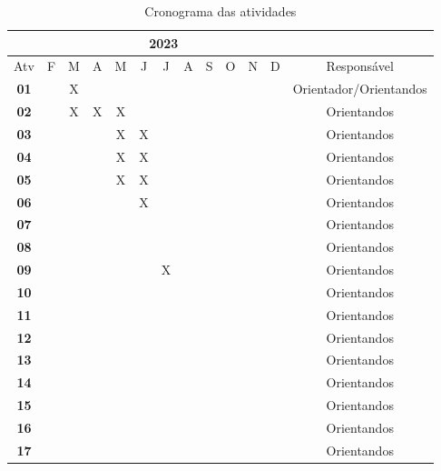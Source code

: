 \begin{table*}[ht]
\centering
\caption{Cronograma das atividades}
\label{tab:cronograma}
    \begin{tabular}{|c|c|c|c|c|c|c|c|c|c|c|c|c|}
        \hline & \multicolumn{11}{|c|}{2023} & \multicolumn{1}{|c|}{} \\
        \hline \multicolumn{1}{|c|}{Atv} & F & M & A & M & J & J & A & S & O & N & D & {Responsável} \\
        \hline \textbf{01} & & X& & & & & & & & & & Orientador/Orientandos \\
        \hline \textbf{02} & & X& X& X& & & & & & & & Orientandos \\
        \hline \textbf{03} & & & & X& X& & & & & & & Orientandos\\
        \hline \textbf{04} & & & & X& X& & & & & & & Orientandos\\
        \hline \textbf{05} & & & & X& X& & & & & & & Orientandos\\
        \hline \textbf{06} & & & & & X& & & & & & & Orientandos\\
        \hline \textbf{07} & & & & & & & & & & & & Orientandos\\
        \hline \textbf{08} & & & & & & & & & & & & Orientandos\\
        \hline \textbf{09} & & & & & & X& & & & & & Orientandos\\
        \hline \textbf{10} & & & & & & & & & & & & Orientandos\\
        \hline \textbf{11} & & & & & & & & & & & & Orientandos\\
        \hline \textbf{12} & & & & & & & & & & & & Orientandos\\
        \hline \textbf{13} & & & & & & & & & & & & Orientandos\\
        \hline \textbf{14} & & & & & & & & & & & & Orientandos\\
        \hline \textbf{15} & & & & & & & & & & & & Orientandos\\
        \hline \textbf{16} & & & & & & & & & & & & Orientandos\\
        \hline \textbf{17} & & & & & & & & & & & & Orientandos\\
        \hline
    \end{tabular} 
\end{table*}

    
    
    